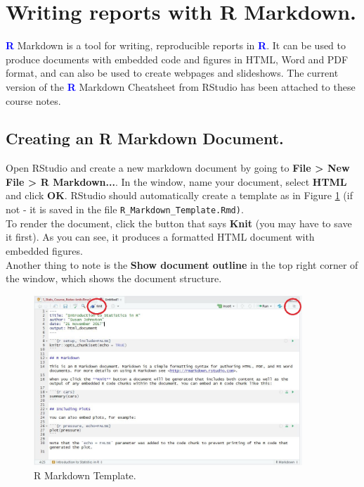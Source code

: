 \documentclass[a4paper,12pt]{article}
\newcommand\boldblue[1]{\textcolor{blue}{\textbf{#1}}}
\begin{document}
\section {Writing reports with R Markdown.}


\boldblue{R} Markdown is a tool for writing, reproducible reports in \boldblue{R}. It can be used to produce documents with embedded code and figures in HTML, Word and PDF format, and can also be used to create webpages and slideshows. The current version of the \boldblue{R} Markdown Cheatsheet from RStudio has been attached to these course notes.

\subsection{Creating an R Markdown Document.}

Open RStudio and create a new markdown document by going to \textbf{File > New File > R Markdown...}. In the window, name your document, select \textbf{HTML} and click \textbf{OK}. RStudio should automatically create a template as in Figure \ref{fig:MarkdownTemplate} (if not - it is saved in the file \texttt{R\_Markdown\_Template.Rmd)}. \\

To render the document, click the button that says \textbf{Knit} (you may have to save it first). As you can see, it produces a formatted HTML document with embedded figures. \\

Another thing to note is the \textbf{Show document outline} in the top right corner of the window, which shows the document structure.

\begin{figure}[h]
	\centering 
	\includegraphics[width=0.9\textwidth]{figs/MarkdownTemplate.JPG}
	\caption{R Markdown Template.}
	\label{fig:MarkdownTemplate}
\end{figure} 
\end{document}
